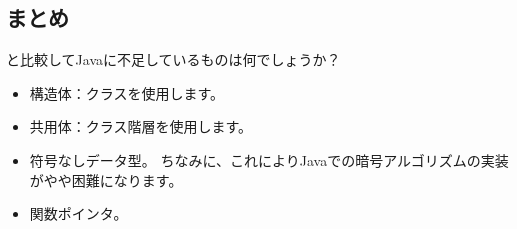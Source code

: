 \subsection{まとめ}

\CCpp と比較してJavaに不足しているものは何でしょうか？


\begin{itemize}
\item 構造体：クラスを使用します。

\item 共用体：クラス階層を使用します。

\item 符号なしデータ型。
ちなみに、これによりJavaでの暗号アルゴリズムの実装がやや困難になります。


\item 関数ポインタ。
\end{itemize}

